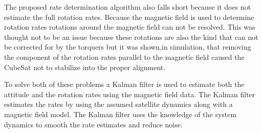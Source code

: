 The proposed rate determination algorithm also falls short because it does not estimate the full rotation rates. Because the magnetic field is used to determine rotation rates rotations around the magnetic field can not be resolved. This was thought not to be an issue because these rotations are also the kind that can not be corrected for by the torquers but it was shown,in simulation, that removing the component of the rotation rates parallel to the magnetic field caused the CubeSat not to stabilize into the proper alignment. 

To solve both of these problems a Kalman filter is used to estimate both the attitude and the rotation rates using the magnetic field data. The Kalman filter estimates the rates by using the assumed satellite dynamics along with a magnetic field model. The Kalman filter uses the knowledge of the system dynamics to smooth the rate estimates and reduce noise. 



